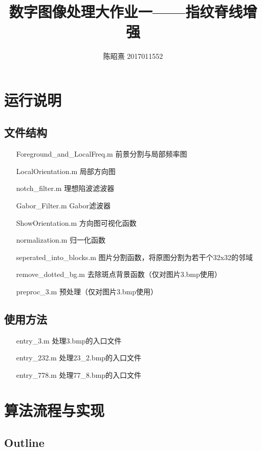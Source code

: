 \documentclass[UTF8]{ctexart}
\begin{document}
\title{数字图像处理大作业一——指纹脊线增强}
\author{陈昭熹 2017011552}
\maketitle

\section{运行说明}
\subsection{文件结构}

\begin{itemize}
    \item[Foreground\_and\_LocalFreq.m] 前景分割与局部频率图
    \item[LocalOrientation.m] 局部方向图
    \item[notch\_filter.m] 理想陷波滤波器
    \item[Gabor\_Filter.m] Gabor滤波器
    \item[ShowOrientation.m] 方向图可视化函数
    \item[normalization.m] 归一化函数 
    \item[seperated\_into\_blocks.m] 图片分割函数，将原图分割为若干个32x32的邻域
    \item[remove\_dotted\_bg.m] 去除斑点背景函数（仅对图片3.bmp使用）
    \item[preproc\_3.m] 预处理（仅对图片3.bmp使用）
\end{itemize}


\subsection{使用方法}
\begin{itemize}
    \item[entry\_3.m] 处理3.bmp的入口文件
    \item[entry\_232.m] 处理23\_2.bmp的入口文件
    \item[entry\_778.m] 处理77\_8.bmp的入口文件
\end{itemize}

\section{算法流程与实现}

\subsection{Outline}
\end{document}
